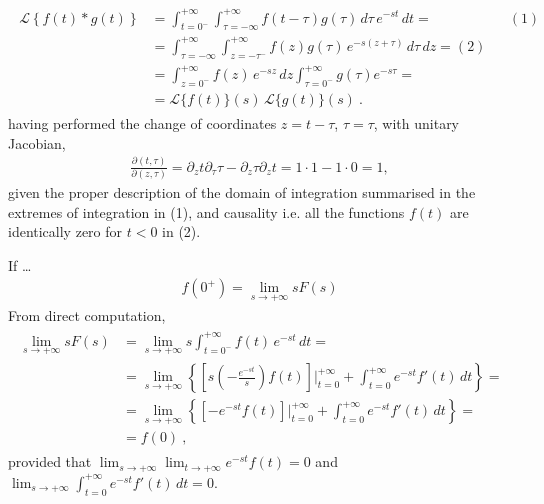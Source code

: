 \documentclass[letterpaper,10pt,english]{jupyterBook}
\begin{document}
\sphinxAtStartPar
{}
\begin{equation}\label{equation:ch/complex/laplace:laplace:convolution}
\begin{split}\begin{aligned}
  \mathscr{L}\left\{ f(t) \ast g(t) \right\} 
  & = \int_{t=0^-}^{+\infty} \int_{\tau=-\infty}^{+\infty} f(t-\tau) g(\tau) \, d \tau \, e^{-s t }\, dt = && (1) \\
  & = \int_{\tau=-\infty}^{+\infty} \int_{z=-\tau^-}^{+\infty} f(z) g(\tau) \, e^{-s (z + \tau)}\, d\tau \, dz = (2) \\
  & = \int_{z=0^-}^{+\infty} f(z) \, e^{-s z }\, dz \int_{\tau=0^-}^{+\infty} g(\tau) e^{-s \tau} = \\
  & = \mathscr{L}\{ f(t) \}(s) \, \mathscr{L}\{ g(t) \} (s) \ .
\end{aligned}\end{split}
\end{equation}
\sphinxAtStartPar
having performed the change of coordinates \(z = t - \tau\), \(\tau = \tau\), with unitary Jacobian,
\begin{equation*}
\begin{split}\frac{\partial(t,\tau)}{\partial(z,\tau)} = \partial_z t \partial_{\tau} \tau - \partial_z \tau \partial_z t =  1 \cdot 1 - 1 \cdot 0 = 1 ,\end{split}
\end{equation*}
\sphinxAtStartPar
given the proper description of the domain of integration summarised in the extremes of integration in (1), and causality \sphinxhyphen{} i.e. all the functions \(f(t)\) are identically zero for \(t < 0\) \sphinxhyphen{} in (2).

\sphinxAtStartPar
{} If …
\begin{equation*}
\begin{split}f(0^+) = \lim_{s \rightarrow + \infty} s F(s)\end{split}
\end{equation*}
\sphinxAtStartPar
From direct computation,
\begin{equation*}
\begin{split}\begin{aligned}
 \lim_{s \rightarrow +\infty} s F(s)
 & = \lim_{s \rightarrow +\infty} s \int_{t = 0^-}^{+\infty} f(t) \, e^{-st} \, dt = \\
 & = \lim_{s\rightarrow + \infty} \left\{ \left[s \left(-\frac{e^{-st}}{s}\right)f(t) \right]\bigg|_{t=0}^{+\infty} + \int_{t=0}^{+\infty} e^{-st} f'(t) \, dt \right\} = \\
 & = \lim_{s \rightarrow +\infty} \left\{ \left[-e^{-st} f(t) \right]\bigg|_{t=0}^{+\infty} + \int_{t=0}^{+\infty} e^{-st} f'(t) \, dt \right\} = \\
 & = f(0) \ ,
\end{aligned}\end{split}
\end{equation*}
\sphinxAtStartPar
provided that \(\lim_{s \rightarrow +\infty} \lim_{t \rightarrow +\infty} e^{-s t} f(t) = 0\) and \(\lim_{s \rightarrow + \infty} \int_{t=0}^{+\infty} e^{-st} f'(t) \, dt = 0\).
\end{document}
